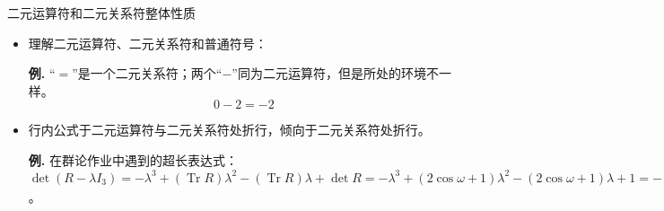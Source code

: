 \documentclass[mathserif]{beamer}
\newcommand{\codegreen}[1]{\textcolor{codegreen}{#1}}
\newcommand{\me}[1]{\mathrm{e}^{#1}}
\newcommand{\mi}{\mathrm{i}}
\newenvironment{instance}{\zihao{-5}\textbf{\songti \codegreen{例.}}}{\hfill\par}
\begin{document}
\begin{frame}{二元运算符和二元关系符}{整体性质}
\begin{itemize}

\item 理解二元运算符、二元关系符和普通符号：

\begin{instance}
	``$=$''是一个二元关系符；两个``$-$''同为二元运算符，但是所处的环境不一样。
\begin{equation*}
	0 - 2 = -2
\end{equation*}
\end{instance}

\item 行内公式于二元运算符与二元关系符处折行，倾向于二元关系符处折行。

\begin{instance}
	在群论作业中遇到的超长表达式：$\operatorname{det} \left( R - \lambda I_{3} \right) = -\lambda^{3} + (\operatorname{Tr} R) \lambda^{2} - (\operatorname{Tr} R) \lambda + \operatorname{det} R = -\lambda^{3} + (2 \cos\omega + 1) \lambda^{2} - (2 \cos\omega + 1) \lambda + 1 = - (\lambda - 1) \left( \lambda - \me{\mi \omega} \right) \left( \lambda - \me{-\mi \omega} \right)=0$。
\end{instance}

\end{itemize}
\end{frame}
\end{document}
